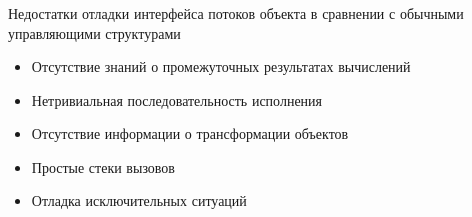 \begin{frame}
\frametitle{\insertsection} 
\framesubtitle{\insertsubsection}
Недостатки отладки интерфейса потоков объекта в сравнении с обычными управляющими структурами
\begin{itemize}
	\item Отсутствие знаний о промежуточных результатах вычислений 
	\item Нетривиальная последовательность исполнения
	\item Отсутствие информации о трансформации объектов
	\item Простые стеки вызовов
	\item Отладка исключительных ситуаций %
\end{itemize}
\end{frame}
